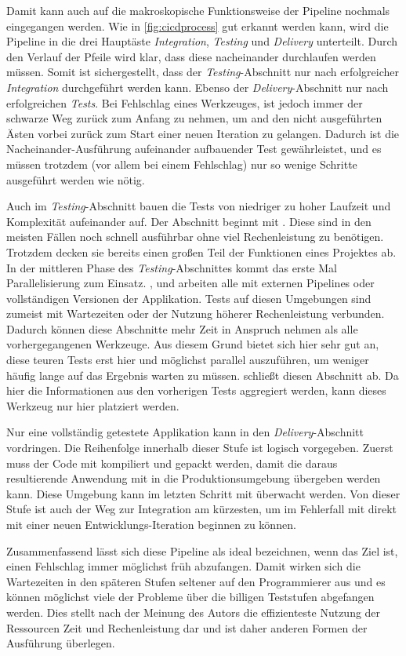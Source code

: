 Damit kann auch auf die makroskopische Funktionsweise der Pipeline nochmals eingegangen werden. Wie in \autoref{fig:cicdprocess} gut erkannt werden kann, wird die Pipeline in die drei Hauptäste \emph{Integration}, \emph{Testing} und \emph{Delivery} unterteilt. Durch den Verlauf der Pfeile wird klar, dass diese nacheinander durchlaufen werden müssen. Somit ist sichergestellt, dass der \emph{Testing}-Abschnitt nur nach erfolgreicher \emph{Integration} durchgeführt werden kann. Ebenso der \emph{Delivery}-Abschnitt nur nach erfolgreichen \emph{Tests}. Bei Fehlschlag eines Werkzeuges, ist jedoch immer der schwarze Weg zurück zum Anfang zu nehmen, um and den nicht ausgeführten Ästen vorbei zurück zum Start einer neuen Iteration zu gelangen. Dadurch ist die Nacheinander-Ausführung aufeinander aufbauender Test gewährleistet, und es müssen trotzdem (vor allem bei einem Fehlschlag) nur so wenige Schritte ausgeführt werden wie nötig.

Auch im \emph{Testing}-Abschnitt bauen die Tests von niedriger zu hoher Laufzeit und Komplexität aufeinander auf. Der Abschnitt beginnt mit . Diese sind in den meisten Fällen noch schnell ausführbar ohne viel Rechenleistung zu benötigen. Trotzdem decken sie bereits einen großen Teil der Funktionen eines Projektes ab. 
In der mittleren Phase des \emph{Testing}-Abschnittes kommt das erste Mal Parallelisierung zum Einsatz. ,  und  arbeiten alle mit externen Pipelines oder vollständigen Versionen der Applikation. Tests auf diesen Umgebungen sind zumeist mit Wartezeiten oder der Nutzung höherer Rechenleistung verbunden. Dadurch können diese Abschnitte mehr Zeit in Anspruch nehmen als alle vorhergegangenen Werkzeuge. Aus diesem Grund bietet sich hier sehr gut an, diese \glqq teuren\grqq{} Tests erst hier und möglichst parallel auszuführen, um weniger häufig lange auf das Ergebnis warten zu müssen.
 schließt diesen Abschnitt ab. Da hier die Informationen aus den vorherigen Tests aggregiert werden, kann dieses Werkzeug nur hier platziert werden.

Nur eine vollständig getestete Applikation kann in den \emph{Delivery}-Abschnitt vordringen. Die Reihenfolge innerhalb dieser Stufe ist logisch vorgegeben. Zuerst muss der Code mit  kompiliert und gepackt werden, damit die daraus resultierende Anwendung mit  in die Produktionsumgebung übergeben werden kann. Diese Umgebung kann im letzten Schritt mit  überwacht werden. Von dieser Stufe ist auch der Weg zur Integration am kürzesten, um im Fehlerfall mit direkt mit einer neuen Entwicklungs-Iteration beginnen zu können.

Zusammenfassend lässt sich diese Pipeline als \glqq ideal\grqq{} bezeichnen, wenn das Ziel ist, einen Fehlschlag immer möglichst früh abzufangen. Damit wirken sich die Wartezeiten in den späteren Stufen seltener auf den Programmierer aus und es können möglichst viele der Probleme über die billigen Teststufen abgefangen werden.
Dies stellt nach der Meinung des Autors die effizienteste Nutzung der Ressourcen Zeit und Rechenleistung dar und ist daher anderen Formen der Ausführung überlegen.
